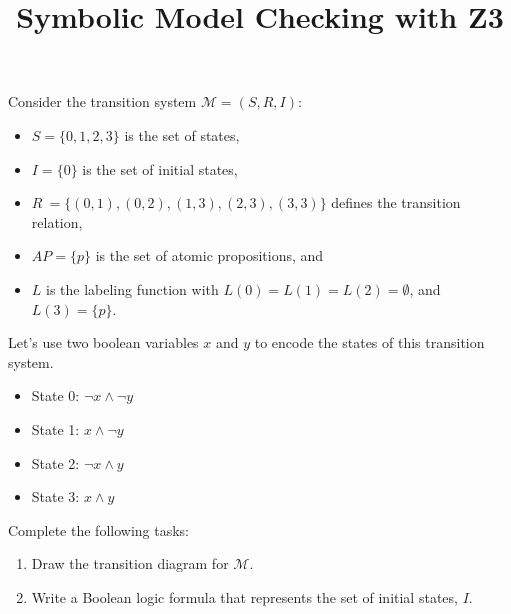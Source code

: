 \documentclass[12pt]{article}
\title{Symbolic Model Checking with Z3}
\date{}
\newenvironment{problem}[2][Problem]{\begin{trivlist}
\item[\hskip \labelsep {\bfseries #1}\hskip \labelsep {\bfseries #2.}]}{\end{trivlist}}
\begin{document}
\maketitle

\vspace{-2cm}
\begin{problem}{Symbolic Model Checking}Consider the transition system $\mathcal{M} = (S, R, I)$:

\begin{itemize} 

\item $S = \{0, 1, 2, 3\}$ is the set of states,

\item $I = \{0\}$ is the set of initial states,

\item $R \ = \{(0, 1), (0, 2), (1, 3), (2, 3), (3, 3)\}$
defines the transition relation, 

\item $AP = \{p\}$ is the set of atomic propositions, and 

\item $L$ is the labeling function with 
$L(0) = L(1) = L(2) = \emptyset$, and $L(3) = \{p\}$.

\end{itemize}

Let's  use two boolean variables $x$ and $y$ to encode the states of this transition system.

\begin{multicols}{4}
\begin{itemize}

\item State 0: $\neg x \land \neg y$
\item State 1: $x \land \neg y $
\item State 2: $\neg x \land y $
\item State 3: $x \land y$

\end{itemize}
\end{multicols}

Complete the following tasks:

\begin{enumerate}[label=\roman*.]

\item  Draw the transition diagram for $\mathcal{M}$.

\item  Write a Boolean logic formula that represents the set of initial states, $I$.


\end{enumerate}
\end{problem}
\end{document}
